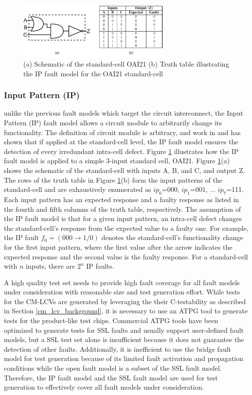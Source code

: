 \documentclass[journal]{IEEEtran}
\begin{document}
\begin{figure}[h]
	\centering
	\includegraphics[width=3in]{ip_example}
	\caption{(a) Schematic of the standard-cell OAI21 (b) Truth table illustrating the IP fault model for the OAI21 standard-cell}
	\label{fig_fault_model}
\end{figure}

\subsubsection{Input Pattern (IP)} unlike the previous fault models which target the circuit interconnect, the Input Pattern (IP) fault model \cite{ip} allows a circuit module to arbitrarily change its functionality. The definition of circuit module is arbitrary, and work in \cite{ip} and \cite{gate_exhaustive} has shown that if applied at the standard-cell level, the IP fault model ensures the detection of every irredundant intra-cell defect. Figure \ref{fig_fault_model} illustrates how the IP fault model is applied to a simple 3-input standard cell, OAI21. Figure \ref{fig_fault_model}(a) shows the schematic of the standard-cell with inputs A, B, and C, and output Z. The rows of the truth table in Figure \ref{fig_fault_model}(b) form the input patterns of the standard-cell and are exhaustively enumerated as \textit{$ip_0$}=000, \textit{$ip_1$}=001, ... \textit{$ip_7$}=111. Each input pattern has an expected response and a faulty response as listed in the fourth and fifth columns of the truth table, respectively. The assumption of the IP fault model is that for a given input pattern, an intra-cell defect changes the standard-cell's response from the expected value to a faulty one. For example, the IP fault $f_0=(000 \rightarrow 1/0)$ denotes the standard-cell's functionality change for the first input pattern, where the first value after the arrow indicates the expected response and the second value is the faulty response. For a standard-cell with $n$ inputs, there are $2^n$ IP faults.

A high quality test set needs to provide high fault coverage for all fault models under consideration with reasonable size and test generation effort. While tests for the CM-LCVs are generated by leveraging the their C-testability as described in Section \ref{cm_lcv_background}, it is necessary to use an ATPG tool to generate tests for the product-like test chips. Commercial ATPG tools have been optimized to generate tests for SSL faults and usually support user-defined fault models, but a SSL test set alone is insufficient because it does not guarantee the detection of other faults. Additionally, it is inefficient to use the bridge fault model for test generation because of its limited fault activation and propagation conditions while the open fault model is a subset of the SSL fault model. Therefore, the IP fault model and the SSL fault model are used for test generation to effectively cover all fault models under consideration.
\end{document}
